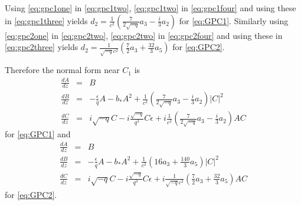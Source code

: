 Using \eqref{eq:gpc1one} in \eqref{eq:gpc1two}, \eqref{eq:gpc1two} in \eqref{eq:gpc1four} and using these in \eqref{eq:gpc1three} yields 
$ d_2 = \frac{1}{c^2}\left( \frac{7}{2 \sqrt{-q} } a_3 - \frac{i}{3} a_2 \right)$ for \eqref{eq:GPC1}.
Similarly using \eqref{eq:gpc2one} in \eqref{eq:gpc2two}, \eqref{eq:gpc2two} in \eqref{eq:gpc2four} and using these in \eqref{eq:gpc2three}  yields
$ d_2 = \frac{1}{\sqrt{-q} c^2}\left( \frac{7}{2 } a_3 + \frac{32}{3} a_5 \right)$  for \eqref{eq:GPC2}. 

Therefore the normal form near $C_1$ is 
\begin{subequations}\label{eq:GPC1normal}
\begin{eqnarray} \label{eq:GPC1normalA}
\frac{dA}{dz} &=& B \\ 
\frac{dB}{dz} &=& -\frac{\epsilon}{q} A - b_* A^2 + \frac{1}{c^2}\left( \frac{7}{2 \sqrt{-q} } a_3 - \frac{i}{3} a_2 \right)  \left|C\right|^2  \label{eq:GPC1normalB} \\
\frac{dC}{dz} &=& i \sqrt{-q} C - i \frac{\sqrt{-q} }{q^3} C\epsilon + i \frac{1}{c^2}\left( \frac{7}{2 \sqrt{-q} } a_3 - \frac{i}{3} a_2 \right)A C \label{eq:GPC1normalC}
\end{eqnarray}
\end{subequations}
for \eqref{eq:GPC1} and
\begin{subequations}\label{eq:GPC2normal}
\begin{eqnarray} \label{eq:GPC2normalA}
\frac{dA}{dz} &=& B \\ 
\frac{dB}{dz} &=& -\frac{\epsilon}{q} A - b_* A^2 + \frac{1}{c^2}\left( 16 a_3 + \frac{140}{3} a_5 \right)  \left|C\right|^2  \label{eq:GPC2normalB} \\
\frac{dC}{dz} &=& i \sqrt{-q} C - i \frac{\sqrt{-q} }{q^3} C\epsilon + i \frac{1}{\sqrt{-q} c^2}\left( \frac{7}{2 } a_3 + \frac{32}{3} a_5 \right)A C \label{eq:GPC2normalC}
\end{eqnarray}
\end{subequations}
for \eqref{eq:GPC2}.

